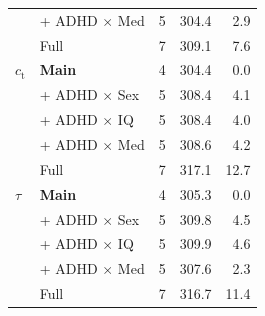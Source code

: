 \begin{longtable}{l l c r r}
         & + ADHD $\times$ Med & 5 & 304.4 & 2.9 \\
         & Full & 7 & 309.1 & 7.6 \\
        \midrule
        $c_{\text{t}}$ & \textbf{Main} & 4 & 304.4 & 0.0 \\
         & + ADHD $\times$ Sex & 5 & 308.4 & 4.1 \\
         & + ADHD $\times$ IQ & 5 & 308.4 & 4.0 \\
         & + ADHD $\times$ Med & 5 & 308.6 & 4.2 \\
         & Full & 7 & 317.1 & 12.7 \\
        \midrule
        $\tau$ & \textbf{Main} & 4 & 305.3 & 0.0 \\
         & + ADHD $\times$ Sex & 5 & 309.8 & 4.5 \\
         & + ADHD $\times$ IQ & 5 & 309.9 & 4.6 \\
         & + ADHD $\times$ Med & 5 & 307.6 & 2.3 \\
         & Full & 7 & 316.7 & 11.4 \\
    \end{longtable}
\endgroup
